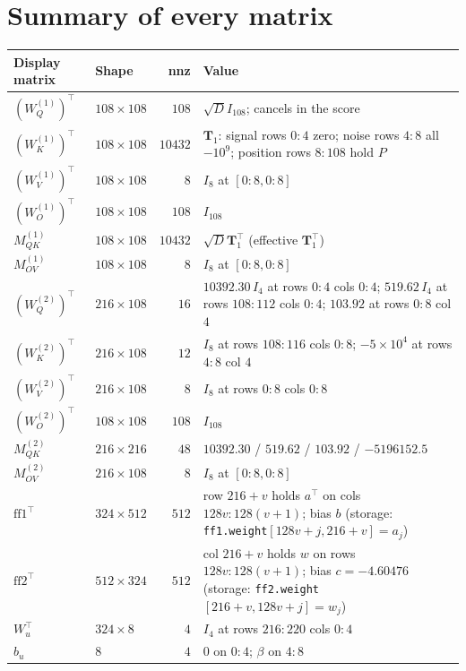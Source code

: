\documentclass[11pt]{article}
\newcommand{\Wq}{W_Q}
\newcommand{\Wk}{W_K}
\newcommand{\Wv}{W_V}
\newcommand{\Wo}{W_O}
\newcommand{\sd}{\sqrt{D}}
\begin{document}
\section{Summary of every matrix}
\begin{center}
\begin{tabular}{@{}llrp{7.4cm}@{}}
\toprule
\textbf{Display matrix} & \textbf{Shape} & \textbf{nnz} & \textbf{Value}\\
\midrule
$(\Wq^{(1)})^\top$ & $108\times108$ & $108$ & $\sd I_{108}$; cancels in the score\\
$(\Wk^{(1)})^\top$ & $108\times108$ & $10432$ & $\bm{T}_1$: signal rows $0{:}4$ zero; noise rows $4{:}8$ all $-10^9$; position rows $8{:}108$ hold $P$\\
$(\Wv^{(1)})^\top$ & $108\times108$ & $8$ & $I_8$ at $[0{:}8,0{:}8]$\\
$(\Wo^{(1)})^\top$ & $108\times108$ & $108$ & $I_{108}$\\
$M^{(1)}_{QK}$ & $108\times108$ & $10432$ & $\sd\bm{T}_1^\top$ (effective $\bm{T}_1^\top$)\\
$M^{(1)}_{OV}$ & $108\times108$ & $8$ & $I_8$ at $[0{:}8,0{:}8]$\\
\midrule
$(\Wq^{(2)})^\top$ & $216\times108$ & $16$ & $10392.30\,I_4$ at rows $0{:}4$ cols $0{:}4$; $519.62\,I_4$ at rows $108{:}112$ cols $0{:}4$; $103.92$ at rows $0{:}8$ col $4$\\
$(\Wk^{(2)})^\top$ & $216\times108$ & $12$ & $I_8$ at rows $108{:}116$ cols $0{:}8$; $-5\times10^4$ at rows $4{:}8$ col $4$\\
$(\Wv^{(2)})^\top$ & $216\times108$ & $8$ & $I_8$ at rows $0{:}8$ cols $0{:}8$\\
$(\Wo^{(2)})^\top$ & $108\times108$ & $108$ & $I_{108}$\\
$M^{(2)}_{QK}$ & $216\times216$ & $48$ & $10392.30$ / $519.62$ / $103.92$ / $-5196152.5$\\
$M^{(2)}_{OV}$ & $216\times108$ & $8$ & $I_8$ at $[0{:}8,0{:}8]$\\
\midrule
$\mathrm{ff1}^\top$ & $324\times512$ & $512$ & row $216{+}v$ holds $a^\top$ on cols $128v{:}128(v{+}1)$; bias $b$ (storage: \texttt{ff1.weight}$[128v{+}j,216{+}v]=a_j$)\\
$\mathrm{ff2}^\top$ & $512\times324$ & $512$ & col $216{+}v$ holds $w$ on rows $128v{:}128(v{+}1)$; bias $c=-4.60476$ (storage: \texttt{ff2.weight}$[216{+}v,128v{+}j]=w_j$)\\
$W_u^\top$ & $324\times8$ & $4$ & $I_4$ at rows $216{:}220$ cols $0{:}4$\\
$b_u$ & $8$ & $4$ & $0$ on $0{:}4$; $\beta$ on $4{:}8$\\
\bottomrule
\end{tabular}
\end{center}
\end{document}
